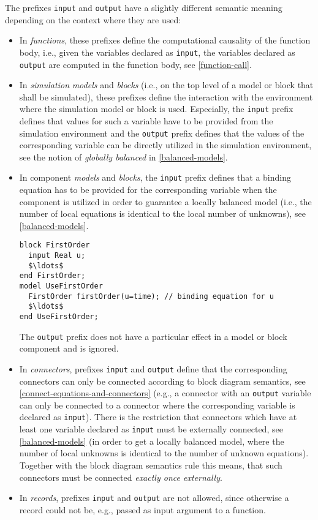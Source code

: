 The prefixes \lstinline!input! and \lstinline!output! have a slightly different semantic meaning depending on the context where they are used:
\begin{itemize}
\item
  In \emph{functions}, these prefixes define the computational causality
  of the function body, i.e., given the variables declared as \lstinline!input!, the
  variables declared as \lstinline!output! are computed in the function body, see
  \cref{function-call}.
\item
  In \emph{simulation} \emph{models} and \emph{blocks} (i.e., on the top level of a model or block that shall be simulated), these prefixes define the interaction with the environment where the simulation model or block is used.
  Especially, the \lstinline!input! prefix defines that values for such a variable have to be provided from the simulation environment and the \lstinline!output! prefix defines that the values of the corresponding variable can be directly utilized in the simulation environment, see the notion of \emph{globally balanced} in \cref{balanced-models}.
\item
  In component \emph{models} and \emph{blocks}, the \lstinline!input! prefix defines
  that a binding equation has to be provided for the corresponding
  variable when the component is utilized in order to guarantee a
  locally balanced model (i.e., the number of local equations is
  identical to the local number of unknowns), see \cref{balanced-models}.
\begin{example}
\begin{lstlisting}[language=modelica]
block FirstOrder
  input Real u;
  $\ldots$
end FirstOrder;
model UseFirstOrder
  FirstOrder firstOrder(u=time); // binding equation for u
  $\ldots$
end UseFirstOrder;
\end{lstlisting}
\end{example}
  The \lstinline!output! prefix does not have a particular effect in a model or block
  component and is ignored.
\item
  In \emph{connectors}, prefixes \lstinline!input! and \lstinline!output! define that the
  corresponding connectors can only be connected according to block
  diagram semantics, see \cref{connect-equations-and-connectors} (e.g., a connector with an \lstinline!output!
  variable can only be connected to a connector where the corresponding
  variable is declared as \lstinline!input!). There is the restriction that
  connectors which have at least one variable declared as \lstinline!input! must be
  externally connected, see \cref{balanced-models} (in order to get a locally
  balanced model, where the number of local unknowns is identical to the
  number of unknown equations). Together with the block diagram
  semantics rule this means, that such connectors must be connected
  \emph{exactly once externally}.
\item
  In \emph{records}, prefixes \lstinline!input! and \lstinline!output! are not allowed, since
  otherwise a record could not be, e.g., passed as input argument to a
  function.
\end{itemize}

